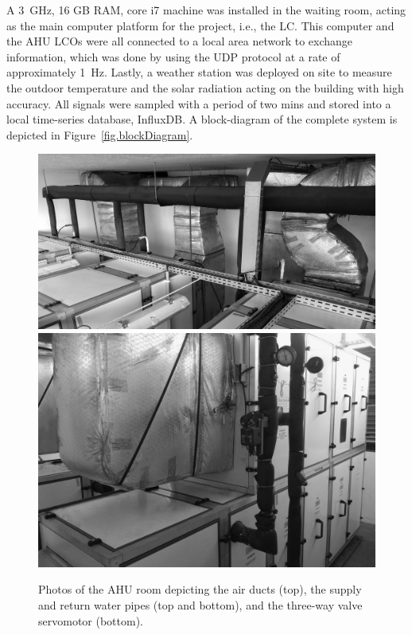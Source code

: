 {\tiny }A 3~GHz, 16 GB RAM, core i7 machine was installed in the waiting room, acting as the main computer platform for the project, i.e., the LC. This computer and the AHU LCOs were all connected to a local area network to exchange information, which was done by using the UDP protocol at a rate of approximately 1~Hz. Lastly, a weather station was deployed on site to measure the outdoor temperature and the solar radiation acting on the building with high accuracy. All signals were sampled with a period of two mins and stored into a local time-series database, InfluxDB. A block-diagram of the complete system is depicted in Figure~\ref{fig.blockDiagram}.  

\begin{figure}[!t]
	\centering
	\includegraphics[width=0.75\linewidth]{../images/chap3_ahus_b.jpg} \\[8pt]
	\includegraphics[width=0.75\linewidth]{../images/chap3_ahus_a.jpg} 
	\caption{Photos of the AHU room depicting the air ducts (top), the supply and return water pipes (top and bottom), and the three-way valve servomotor (bottom).}
	\label{fig.ahuRoom}
\end{figure}


